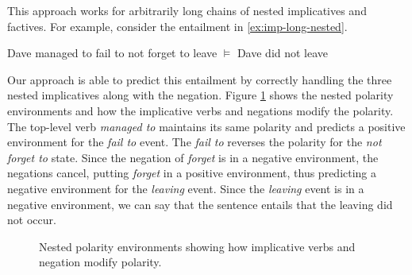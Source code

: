 This approach works for arbitrarily long chains of nested implicatives and
factives.
For example, consider the entailment in \eqref{ex:imp-long-nested}.
\begin{covex}\label{ex:imp-long-nested}
  Dave managed to fail to not forget to leave $\vDash$ Dave did not leave
\end{covex}
Our approach is able to predict this entailment by correctly handling the three
nested implicatives along with the negation. Figure \ref{fig:imp-fact-nested} 
shows the nested polarity environments and how the implicative verbs and negations 
modify the polarity.  The top-level verb {\it managed to} maintains its same 
polarity and predicts a positive environment for the {\it fail to} event.  The 
{\it fail to} reverses the polarity for the {\it not forget to} state.  Since
the negation of {\it forget} is in a negative environment, the negations cancel,
putting {\it forget} in a positive environment, thus predicting a
negative environment for the {\it leaving} event.  Since the {\it leaving} event
is in a negative environment, we can say that the sentence entails that the 
leaving did not occur.
\begin{figure}
\caption{Nested polarity environments showing how implicative verbs and
negation modify polarity.}
\label{fig:imp-fact-nested}
\end{figure}



